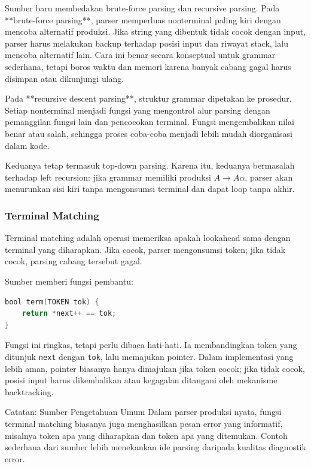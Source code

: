 Sumber baru membedakan brute-force parsing dan recursive parsing. Pada **brute-force parsing**, parser memperluas nonterminal paling kiri dengan mencoba alternatif produksi. Jika string yang dibentuk tidak cocok dengan input, parser harus melakukan backup terhadap posisi input dan riwayat stack, lalu mencoba alternatif lain. Cara ini benar secara konseptual untuk grammar sederhana, tetapi boros waktu dan memori karena banyak cabang gagal harus disimpan atau dikunjungi ulang.

Pada **recursive descent parsing**, struktur grammar dipetakan ke prosedur. Setiap nonterminal menjadi fungsi yang mengontrol alur parsing dengan pemanggilan fungsi lain dan pencocokan terminal. Fungsi mengembalikan nilai benar atau salah, sehingga proses coba-coba menjadi lebih mudah diorganisasi dalam kode.

Keduanya tetap termasuk top-down parsing. Karena itu, keduanya bermasalah terhadap left recursion: jika grammar memiliki produksi $A\rightarrow A\alpha$, parser akan menurunkan sisi kiri tanpa mengonsumsi terminal dan dapat loop tanpa akhir.

\subsubsection{Terminal Matching}

\begin{jawab}
Terminal matching adalah operasi memeriksa apakah lookahead sama dengan terminal yang diharapkan. Jika cocok, parser mengonsumsi token; jika tidak cocok, parsing cabang tersebut gagal.
\end{jawab}

Sumber memberi fungsi pembantu:
\begin{lstlisting}[language=C, caption={Fungsi terminal matching}, label={lst:term-rd}]
bool term(TOKEN tok) {
    return *next++ == tok;
}
\end{lstlisting}

Fungsi ini ringkas, tetapi perlu dibaca hati-hati. Ia membandingkan token yang ditunjuk \texttt{next} dengan \texttt{tok}, lalu memajukan pointer. Dalam implementasi yang lebih aman, pointer biasanya hanya dimajukan jika token cocok; jika tidak cocok, posisi input harus dikembalikan atau kegagalan ditangani oleh mekanisme backtracking.

\begin{cmt}{Catatan: Sumber Pengetahuan Umum}{}
Dalam parser produksi nyata, fungsi terminal matching biasanya juga menghasilkan pesan error yang informatif, misalnya token apa yang diharapkan dan token apa yang ditemukan. Contoh sederhana dari sumber lebih menekankan ide parsing daripada kualitas diagnostik error.
\end{cmt}

